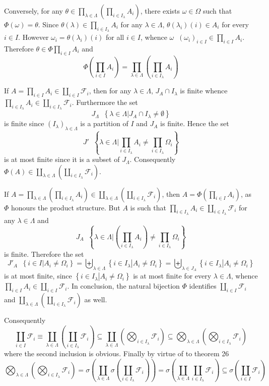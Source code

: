 \documentclass[a4paper]{article}
\newcommand{\obj}[1]{\left\{ #1 \right \}}
\newcommand{\brac}[1]{\left ( #1 \right )}
\newcommand{\induc}[1]{\left . #1 \right \vert}
\newcommand{\Fcal}{\mathcal{F}}
\newcommand{\defn}{\mathop{\overset{\Delta}{=}}\nolimits}
\begin{document}
Conversely, for any $\theta \in \prod_{\lambda\in\Lambda} \brac{ \prod_{i\in I_\lambda} A_i }$, there exists $\omega\in \Omega$ such that $\Phi\brac{\omega} = \theta$. Since $\theta\brac{\lambda}\in \prod_{i\in I_\lambda} A_i$ for any $\lambda\in \Lambda$, $\theta\brac{\lambda_i}\brac{i} \in A_i$ for every $i \in I$. However $\omega_i = \theta\brac{\lambda_i}\brac{i}$ for all $i\in I$, whence $\omega \defn \brac{\omega_i}_{i\in I}\in \prod_{i\in I} A_i$. Therefore $\theta\in \Phi{\prod_{i\in I} A_i}$ and \[\Phi\brac{\prod_{i\in I} A_i} = \prod_{\lambda\in\Lambda} \brac{\prod_{i\in I_\lambda} A_i}\]

If $A = \prod_{i\in I} A_i\in \coprod_{i\in I} \Fcal_i$, then for any $\lambda\in \Lambda$, $J_A\cap I_\lambda$ is finite whence $\prod_{i\in I_\lambda} A_i \in \coprod_{i\in I_\lambda} \Fcal_i$. Furthermore the set \[J_\Lambda\defn \obj{ \induc{ \lambda\in \Lambda } J_A \cap I_\lambda \neq \emptyset}\] is finite since $\brac{I_\lambda}_{\lambda\in \Lambda}$ is a partition of $I$ and $J_A$ is finite. Hence the set \[J'\defn \obj{ \induc{ \lambda \in \Lambda } \prod_{i\in I_\lambda} A_i \neq \prod_{i\in I_\lambda} \Omega_i }\] is at most finite since it is a subset of $J_\Lambda$. Consequently $\Phi\brac{A} \in \coprod_{\lambda\in \Lambda}\brac{ \coprod_{i\in I_\lambda} \Fcal_i }$.

If $A = \prod_{\lambda\in \Lambda}\brac{ \prod_{i\in I_\lambda} A_i } \in \coprod_{\lambda\in \Lambda}\brac{ \coprod_{i\in I_\lambda} \Fcal_i }$, then $A = \Phi\brac{\prod_{i\in I} A_i}$, as $\Phi$ honours the product structure. But $A$ is such that $\prod_{i\in I_\lambda} A_i\in \coprod_{i\in I_\lambda} \Fcal_i$ for any $\lambda\in \Lambda$ and \[J_A\defn \obj{ \induc{\lambda \in \Lambda } \brac{\prod_{i\in I_\lambda} A_i} \neq \prod_{i\in I_\lambda} \Omega_i}\] is finite. Therefore the set\[J'_A \defn \obj{ \induc{ i\in I } A_i \neq \Omega_i } = \biguplus_{\lambda\in \Lambda} \obj{ \induc{ i\in I_\lambda } A_i \neq \Omega_i } = \biguplus_{\lambda\in J_A} \obj{ \induc{ i\in I_\lambda } A_i \neq \Omega_i } \] is at most finite, since $\obj{ \induc{ i\in I_\lambda } A_i \neq \Omega_i }$ is at most finite for every $\lambda \in \Lambda$, whence $\prod_{i\in I} A_i\in \coprod_{i\in I} \Fcal_i$. In conclusion, the natural bijection $\Phi$ identifies $\coprod_{i\in I} \Fcal_i$ and $\coprod_{\lambda\in \Lambda} \brac{\coprod_{i\in I_\lambda} \Fcal_i}$ as well.

Consequently \[\coprod_{i\in I} \Fcal_i \equiv \coprod_{\lambda\in \Lambda} \brac{ \coprod_{i\in I_\lambda} \Fcal_i } \subseteq \coprod_{\lambda\in \Lambda} \brac{ \bigotimes_{i\in I_\lambda} \Fcal_i } \subseteq \bigotimes_{\lambda\in \Lambda}\brac{ \bigotimes_{i\in I_\lambda} \Fcal_i }\] where the second inclusion is obvious. Finally by virtue of to theorem 26 \[ \bigotimes_{\lambda\in \Lambda} \brac{ \bigotimes_{i\in I_\lambda} \Fcal_i } = \sigma\brac{\coprod_{\lambda\in \Lambda} \sigma\brac{ \coprod_{i\in I_\lambda} \Fcal_i }} = \sigma\brac{ \coprod_{\lambda\in \Lambda} \coprod_{i\in I_\lambda} \Fcal_i } \subseteq \sigma\brac{\coprod_{i\in I} \Fcal_i }\]\\
\end{document}
